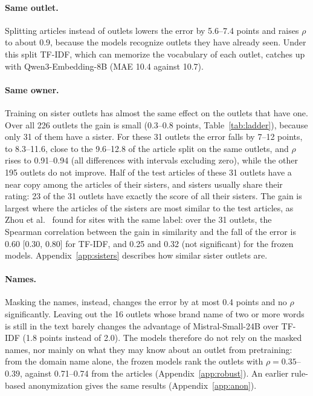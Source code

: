 \documentclass[11pt,a4paper]{article}
\begin{document}
\paragraph{Same outlet.} Splitting articles instead of outlets lowers the error by 5.6--7.4 points and raises $\rho$ to
about 0.9, because the models recognize outlets they have already seen. Under this split TF-IDF, which can memorize the
vocabulary of each outlet, catches up with Qwen3-Embedding-8B (MAE 10.4 against 10.7).

\paragraph{Same owner.} Training on sister outlets has almost the same effect on the outlets that have one. Over all
226 outlets the gain is small (0.3--0.8 points, Table~\ref{tab:ladder}), because only 31 of them have a sister. For
these 31 outlets the error falls by 7--12 points, to 8.3--11.6, close to the 9.6--12.8 of the article split on the
same outlets, and $\rho$ rises to
0.91--0.94 (all differences with intervals excluding zero), while the other 195 outlets do not improve. Half of the test articles of these 31 outlets have a near copy among the articles of their sisters, and sisters
usually share their rating: 23 of the 31 outlets have exactly the score of all their sisters. The gain is largest where
the articles of the sisters are most similar to the test articles, as Zhou et al.~\cite{zhou2021hidden} found for sites
with the same label: over the 31 outlets, the Spearman correlation between the gain in similarity and the fall of the
error is 0.60 [0.30, 0.80] for TF-IDF, and 0.25 and 0.32 (not significant) for the frozen models. Appendix~\ref{app:sisters}
describes how similar sister outlets are.

\paragraph{Names.} Masking the names, instead, changes the error by at most 0.4 points and no $\rho$ significantly.
Leaving out the 16 outlets whose brand name of two or more words is still in the text barely changes the advantage of
Mistral-Small-24B over TF-IDF (1.8 points instead of 2.0). The models therefore do not rely on the masked names, nor
mainly on what they may know about an outlet from pretraining: from the domain name alone, the frozen models rank the
outlets with $\rho = 0.35$--$0.39$, against 0.71--0.74 from the articles (Appendix~\ref{app:robust}). An
earlier rule-based anonymization gives the same results (Appendix~\ref{app:anon}).
\end{document}
